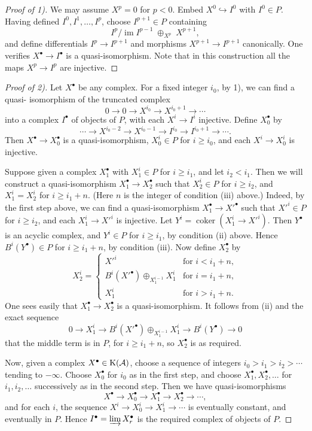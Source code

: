 \begin{proof}[Proof of 1)]
We may assume $X^p=0$ for $p<0$. Embed $X^0\hookrightarrow I^0$ with $I^0\in P$. Having defined $I^0,I^1,\dots,I^p$, choose $I^{p+1}\in P$ containing
\[
I^p\big/\operatorname{im}I^{p-1}\;\oplus_{X^p}\;X^{p+1},
\]
and define differentials $I^p\to I^{p+1}$ and morphisms $X^{p+1}\to I^{p+1}$ canonically. One verifies $X^\bullet\to I^\bullet$ is a quasi-isomorphism. Note that in this construction all the maps $X^p\to I^p$ are injective.
\end{proof}

\begin{proof}[Proof of 2)]
Let $X^\bullet$ be any complex. For a fixed integer $i_0$, by 1), we can find a quasi-
isomorphism of the truncated complex
\[
0\to 0\to X^{i_0}\to X^{i_0+1}\to\cdots
\]
 into a complex $I^\bullet$ of objects of $P$, with each $X^i\to I^i$ injective. Define $X_0^\bullet$ by
\[
\cdots\to X^{i_0-2}\to X^{i_0-1}\to I^{i_0}\to I^{i_0+1}\to\cdots.
\]
Then $X^\bullet\to X_0^\bullet$ is a quasi-isomorphism, $X_0^i\in P$ for $i\ge i_0$, and each $X^i\to X_0^i$ is injective.

Suppose given a complex $X_1^\bullet$ with $X_1^i\in P$ for $i\ge i_1$, and let $i_2<i_1$. Then we will construct a quasi-isomorphism $X_1^\bullet\to X_2^\bullet$ such that $X_2^i\in P$ for $i\ge i_2$, and $X_1^i=X_2^i$ for $i\ge i_1+n$. (Here $n$ is the integer of condition (iii) above.) Indeed, by the first step above, we can find a quasi-isomorphism $X_1^\bullet\to X'^\bullet$ such that $X'^i\in P$ for $i\ge i_2$, and each $X_1^i\to X'^i$ is injective. Let $Y^i=\operatorname{coker}(X_1^i\to X'^i)$. Then $Y^\bullet$ is an acyclic complex, and $Y^i\in P$ for $i\ge i_1$, by condition (ii) above. Hence $B^i(Y^\bullet)\in P$ for $i\ge i_1+n$, by condition (iii). Now define $X_2^\bullet$ by
\[
X_2^i=
\begin{cases}
X'^i & \text{for } i < i_1+n,\\[2pt]
B^i(X'^\bullet) \oplus_{X_1^{i-1}} X_1^i & \text{for } i = i_1+n,\\[2pt]
X_1^i & \text{for } i > i_1+n.
\end{cases}
\]
One sees easily that $X_1^\bullet\to X_2^\bullet$ is a quasi-isomorphism. It follows from (ii) and the exact sequence
\[
0 \longrightarrow X_1^i \longrightarrow B^i(X'^\bullet) \oplus_{X_1^{i-1}} X_1^i \longrightarrow B^i(Y^\bullet) \longrightarrow 0
\]
that the middle term is in $P$, for $i\ge i_1+n$, so $X_2^\bullet$ is as required.

Now, given a complex $X^\bullet\in\operatorname{K}(\mathcal{A})$, choose a sequence of integers $i_0>i_1>i_2>\cdots$ tending to $-\infty$. Choose $X_0^\bullet$ for $i_0$ as in the first step, and choose $X_1^\bullet,X_2^\bullet,\dots$ for $i_1,i_2,\dots$ successively as in the second step. Then we have quasi-isomorphisms
\[
X^\bullet \longrightarrow X_0^\bullet \longrightarrow X_1^\bullet \longrightarrow X_2^\bullet \longrightarrow \cdots,
\]
and for each $i$, the sequence $X^i\to X_0^i\to X_1^i\to\cdots$ is eventually constant, and eventually in $P$. Hence $I^\bullet = \varinjlim X_r^\bullet$ is the required complex of objects of $P$.
\end{proof}

